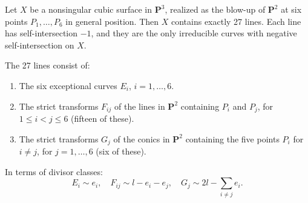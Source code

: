 Let $X$ be a nonsingular cubic surface in $\mathbf{P}^3$, realized as the blow-up of $\mathbf{P}^2$ at six points $P_1, \ldots, P_6$ in general position. Then $X$ contains exactly 27 lines. Each line has self-intersection $-1$, and they are the only irreducible curves with negative self-intersection on $X$.

The 27 lines consist of:
\begin{enumerate}
\item[(a)] The six exceptional curves $E_i$, $i = 1, \ldots, 6$.
\item[(b)] The strict transforms $F_{ij}$ of the lines in $\mathbf{P}^2$ containing $P_i$ and $P_j$, for $1 \leqslant i < j \leqslant 6$ (fifteen of these).
\item[(c)] The strict transforms $G_j$ of the conics in $\mathbf{P}^2$ containing the five points $P_i$ for $i \neq j$, for $j = 1, \ldots, 6$ (six of these).
\end{enumerate}
In terms of divisor classes:
$$E_i \sim e_i, \quad F_{ij} \sim l - e_i - e_j, \quad G_j \sim 2l - \sum_{i \neq j} e_i.$$
